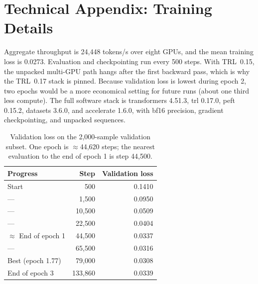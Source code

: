 \documentclass[letterpaper]{article} %
\begin{document}
\section{Technical Appendix: Training Details}
\label{app:training}
Aggregate throughput is 24,448 tokens/s over eight GPUs, and the mean training loss is 0.0273. Evaluation and checkpointing run every 500 steps. With TRL~0.15, the unpacked multi-GPU path hangs after the first backward pass, which is why the TRL~0.17 stack is pinned. Because validation loss is lowest during epoch 2, two epochs would be a more economical setting for future runs (about one third less compute). The full software stack is transformers 4.51.3, trl 0.17.0, peft 0.15.2, datasets 3.6.0, and accelerate 1.6.0, with bf16 precision, gradient checkpointing, and unpacked sequences.

\begin{table}[!htbp]
\centering
\small
\begin{tabular}{lrr}
\toprule
Progress & Step & Validation loss \\
\midrule
Start & 500 & 0.1410 \\
--- & 1,500 & 0.0950 \\
--- & 10,500 & 0.0509 \\
--- & 22,500 & 0.0404 \\
$\approx$ End of epoch 1 & 44,500 & 0.0337 \\
--- & 65,500 & 0.0316 \\
Best (epoch 1.77) & 79,000 & 0.0308 \\
End of epoch 3 & 133,860 & 0.0339 \\
\bottomrule
\end{tabular}
\caption{Validation loss on the 2,000-sample validation subset. One epoch is $\approx$44,620 steps; the nearest evaluation to the end of epoch 1 is step 44,500.}
\label{tab:eval-loss}
\end{table}
\end{document}
